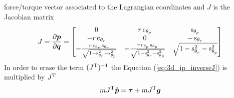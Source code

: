 force/torque vector associated to the Lagrangian coordinates and $J$ is the Jacobian matrix
\[
J = \frac{\partial \vec{p}}{\partial \vec{q}} =
\begin{bmatrix}
  0 & r \cosine{\theta_p} & \sine{\theta_p}\\
  -r\cosine{\theta_r} & 0 & - \sine{\theta_r}\\
  -\frac{r \cosine{\theta_r} \sine{\theta_r}}{\sqrt{1-\sine{\theta_r}^2-\sine{\theta_p}^2}} &   -\frac{r \cosine{\theta_p} \sine{\theta_p}}{\sqrt{1-\sine{\theta_r}^2-\sine{\theta_p}^2}} & \sqrt{1-\sine{\theta_r}^2-\sine{\theta_p}^2}
\end{bmatrix}
\]
In order to erase the term $(J^{\mathrm{T}})^{-1}$ the Equation (\ref{eq:3d_ip_inverseJ})
is multiplied by $J^{\mathrm{T}}$
\begin{equation}
  \label{eq:3d_ip}
  m J^{\mathrm{T}} \ddot{\boldsymbol{p}} = \boldsymbol{\tau} + m J^{\mathrm{T}} \boldsymbol{g}
\end{equation}

